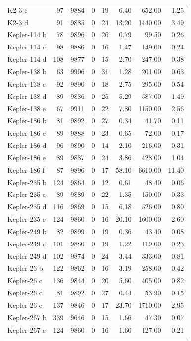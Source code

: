 \begin{table}
\begin{tabular}{lrrrrrrr}
K2-3 c & 97 & 9884 & 0 & 19 & 6.40 & 652.00 & 1.25 \\
K2-3 d & 91 & 9885 & 0 & 24 & 13.20 & 1440.00 & 3.49 \\
Kepler-114 b & 78 & 9896 & 0 & 26 & 0.79 & 99.50 & 0.26 \\
Kepler-114 c & 98 & 9886 & 0 & 16 & 1.47 & 149.00 & 0.24 \\
Kepler-114 d & 108 & 9877 & 0 & 15 & 2.70 & 247.00 & 0.38 \\
Kepler-138 b & 63 & 9906 & 0 & 31 & 1.28 & 201.00 & 0.63 \\
Kepler-138 c & 92 & 9890 & 0 & 18 & 2.75 & 295.00 & 0.54 \\
Kepler-138 d & 89 & 9886 & 0 & 25 & 5.29 & 587.00 & 1.49 \\
Kepler-138 e & 67 & 9911 & 0 & 22 & 7.80 & 1150.00 & 2.56 \\
Kepler-186 b & 81 & 9892 & 0 & 27 & 0.34 & 41.70 & 0.11 \\
Kepler-186 c & 89 & 9888 & 0 & 23 & 0.65 & 72.00 & 0.17 \\
Kepler-186 d & 96 & 9890 & 0 & 14 & 2.10 & 216.00 & 0.31 \\
Kepler-186 e & 89 & 9887 & 0 & 24 & 3.86 & 428.00 & 1.04 \\
Kepler-186 f & 87 & 9896 & 0 & 17 & 58.10 & 6610.00 & 11.40 \\
Kepler-235 b & 124 & 9864 & 0 & 12 & 0.61 & 48.40 & 0.06 \\
Kepler-235 c & 89 & 9889 & 0 & 22 & 1.35 & 150.00 & 0.33 \\
Kepler-235 d & 116 & 9869 & 0 & 15 & 6.18 & 526.00 & 0.80 \\
Kepler-235 e & 124 & 9860 & 0 & 16 & 20.10 & 1600.00 & 2.60 \\
Kepler-249 b & 82 & 9899 & 0 & 19 & 0.36 & 43.40 & 0.08 \\
Kepler-249 c & 101 & 9880 & 0 & 19 & 1.22 & 119.00 & 0.23 \\
Kepler-249 d & 102 & 9874 & 0 & 24 & 3.44 & 333.00 & 0.81 \\
Kepler-26 b & 122 & 9862 & 0 & 16 & 3.19 & 258.00 & 0.42 \\
Kepler-26 c & 136 & 9844 & 0 & 20 & 5.60 & 405.00 & 0.82 \\
Kepler-26 d & 81 & 9892 & 0 & 27 & 0.44 & 53.90 & 0.15 \\
Kepler-26 e & 137 & 9846 & 0 & 17 & 23.70 & 1710.00 & 2.95 \\
Kepler-267 b & 339 & 9646 & 0 & 15 & 1.66 & 47.30 & 0.07 \\
Kepler-267 c & 124 & 9860 & 0 & 16 & 1.60 & 127.00 & 0.21 \\

\end{tabular}
\end{table}
